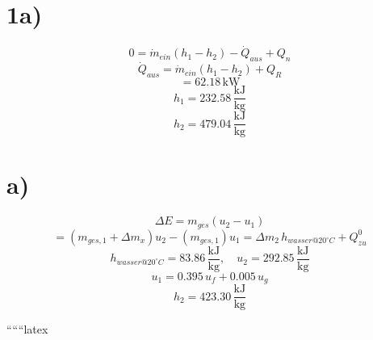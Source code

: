 

\section*{1a)}
\begin{equation*}
0 = \dot{m}_{ein} \left( h_1 - h_2 \right) - \dot{Q}_{aus} + Q_n
\end{equation*}
\begin{equation*}
\dot{Q}_{aus} = \dot{m}_{ein} \left( h_1 - h_2 \right) + Q_R
\end{equation*}
\begin{equation*}
= 62.18 \, \text{kW}
\end{equation*}
\begin{equation*}
h_1 = 232.58 \, \frac{\text{kJ}}{\text{kg}}
\end{equation*}
\begin{equation*}
h_2 = 479.04 \, \frac{\text{kJ}}{\text{kg}}
\end{equation*}



\section*{a)}
\begin{equation*}
\Delta E = m_{ges} \left( u_2 - u_1 \right)
\end{equation*}
\begin{equation*}
= \left( m_{ges,1} + \Delta m_x \right) u_2 - \left( m_{ges,1} \right) u_1 = \Delta m_2 \, h_{wasser@20^\circ C} + Q_{zu}^0
\end{equation*}
\begin{equation*}
h_{wasser@20^\circ C} = 83.86 \, \frac{\text{kJ}}{\text{kg}}, \quad u_2 = 292.85 \, \frac{\text{kJ}}{\text{kg}}
\end{equation*}
\begin{equation*}
u_1 = 0.395 \, u_f + 0.005 \, u_g
\end{equation*}
\begin{equation*}
h_2 = 423.30 \, \frac{\text{kJ}}{\text{kg}}
\end{equation*}

``````latex